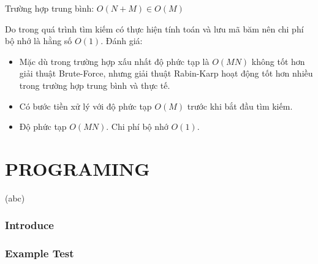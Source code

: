 \documentclass[a4paper,11pt]{article}
\begin{document}
\begin{enumerate}
\begin{itemize}
				Trường hợp trung bình: $O(N+M) \in O(M)$
			\end{itemize}
				Do trong quá trình tìm kiếm có thực hiện tính toán và lưu mã băm nên chi phí bộ nhớ là hằng số $O(1)$.
			Đánh giá:
			\begin{itemize}
				\item Mặc dù trong trường hợp xấu nhất độ phức tạp là $O(MN)$ không tốt hơn giải thuật Brute-Force, nhưng giải thuật Rabin-Karp hoạt động tốt hơn nhiều trong trường hợp trung bình và thực tế.
				\item Có bước tiền xử lý với độ phức tạp $O(M)$ trước khi bắt đầu tìm kiếm.
				\item Độ phức tạp $O(MN)$. Chi phí bộ nhớ $O(1)$.
			\end{itemize}
	\end{enumerate}
	
	\part*{PROGRAMING}
	\label{Crossword game}(abc)
	
	
	\setcounter{section}{0}
	\section{Introduce}
	\section{Example Test}
	
\end{document}
